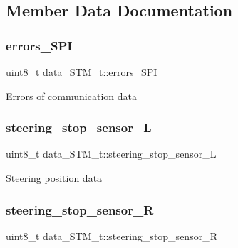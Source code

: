 \subsection{Member Data Documentation}
\hypertarget{structdata___s_t_m__t_aaab013b9618bb1e5045806ff4ff47602}{}\label{structdata___s_t_m__t_aaab013b9618bb1e5045806ff4ff47602} 
\subsubsection{\texorpdfstring{errors\+\_\+\+S\+PI}{errors\_SPI}}
{\footnotesize\ttfamily uint8\+\_\+t data\+\_\+\+S\+T\+M\+\_\+t\+::errors\+\_\+\+S\+PI}

Errors of communication data \hypertarget{structdata___s_t_m__t_a7c8c5193fdfd26fc6cb6b7c78608903d}{}\label{structdata___s_t_m__t_a7c8c5193fdfd26fc6cb6b7c78608903d} 
\subsubsection{\texorpdfstring{steering\+\_\+stop\+\_\+sensor\+\_\+L}{steering\_stop\_sensor\_L}}
{\footnotesize\ttfamily uint8\+\_\+t data\+\_\+\+S\+T\+M\+\_\+t\+::steering\+\_\+stop\+\_\+sensor\+\_\+L}

Steering position data \hypertarget{structdata___s_t_m__t_ad64d7eb43c330d4d3bf79aa82210728a}{}\label{structdata___s_t_m__t_ad64d7eb43c330d4d3bf79aa82210728a} 
\subsubsection{\texorpdfstring{steering\+\_\+stop\+\_\+sensor\+\_\+R}{steering\_stop\_sensor\_R}}
{\footnotesize\ttfamily uint8\+\_\+t data\+\_\+\+S\+T\+M\+\_\+t\+::steering\+\_\+stop\+\_\+sensor\+\_\+R}

